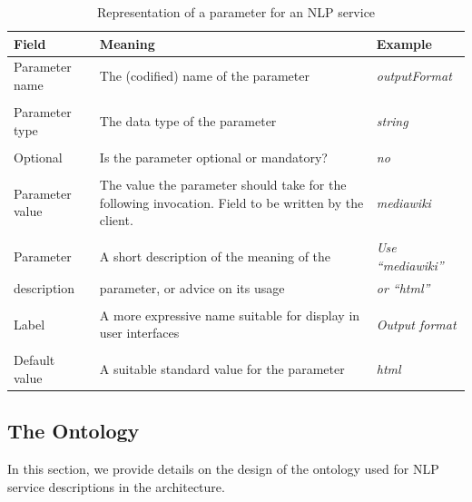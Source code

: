 \begin{table}[htb]
 \centering\small\sffamily
 \begin{tabular}{p{}@{\hspace*{4mm}}p{}@{\hspace*{4mm}}p{}}
   \toprule
   \textbf{Field} & \textbf{Meaning} & \textbf{Example} \\
   \midrule
   Parameter name & The (codified) name of the parameter &
   \emph{outputFormat} \\

   & & \\

   Parameter type & The data type of the parameter & \emph{string} \\

   & & \\

   Optional & Is the parameter optional or mandatory?  & \emph{no} \\

   & & \\

   Parameter value & The value the parameter should take for the
   following invocation. Field to be written by the client. &
   \emph{mediawiki} \\

   & & \\

   Parameter & A short description of the meaning of the & \emph{Use ``mediawiki''} \\
   description & parameter, or advice on its usage & \emph{ or ``html''} \\

   & & \\

   Label & A more expressive name suitable for display in user
   interfaces & \emph{Output format} \\

   & & \\

   Default value & A suitable standard value for the parameter & \emph{html} \\

   \bottomrule
\end{tabular}
 \caption{Representation of a parameter for an NLP service}
 \label{tab:param}
\end{table}

\subsection{The \sa Ontology}
\label{sec:sa_ontology}
In this section, we provide details on the design of the ontology
used for NLP service descriptions in the \sa architecture.

